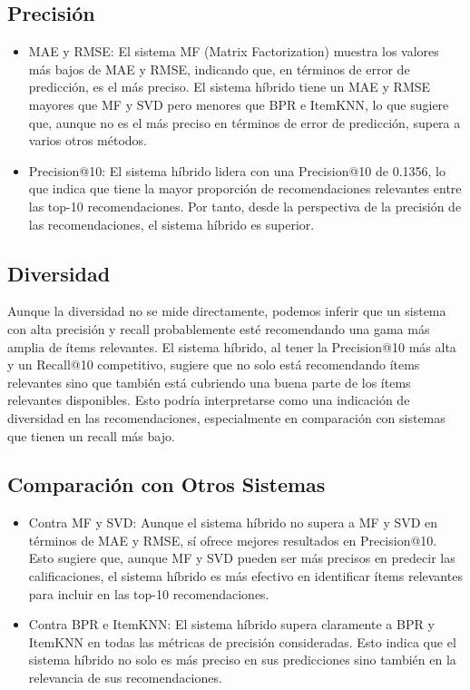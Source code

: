 \documentclass[a4paper,12pt]{report}
\begin{document}
    \subsection{Precisión}
    \begin{itemize}
    \item MAE y RMSE: El sistema MF (Matrix Factorization) muestra los valores más bajos de MAE y RMSE, indicando que, en términos de error de predicción, es el más preciso. El sistema híbrido tiene un MAE y RMSE mayores que MF y SVD pero menores que BPR e ItemKNN, lo que sugiere que, aunque no es el más preciso en términos de error de predicción, supera a varios otros métodos.
    
    \item Precision@10: El sistema híbrido lidera con una Precision@10 de 0.1356, lo que indica que tiene la mayor proporción de recomendaciones relevantes entre las top-10 recomendaciones. Por tanto, desde la perspectiva de la precisión de las recomendaciones, el sistema híbrido es superior.
    \end{itemize}
    

    \subsection{Diversidad}
    Aunque la diversidad no se mide directamente, podemos inferir que un sistema con alta precisión y recall probablemente esté recomendando una gama más amplia de ítems relevantes. El sistema híbrido, al tener la Precision@10 más alta y un Recall@10 competitivo, sugiere que no solo está recomendando ítems relevantes sino que también está cubriendo una buena parte de los ítems relevantes disponibles. Esto podría interpretarse como una indicación de diversidad en las recomendaciones, especialmente en comparación con sistemas que tienen un recall más bajo.


    \subsection{Comparación con Otros Sistemas}

    \begin{itemize}
        \item Contra MF y SVD: Aunque el sistema híbrido no supera a MF y SVD en términos de MAE y RMSE, sí ofrece mejores resultados en Precision@10. Esto sugiere que, aunque MF y SVD pueden ser más precisos en predecir las calificaciones, el sistema híbrido es más efectivo en identificar ítems relevantes para incluir en las top-10 recomendaciones.
        \item Contra BPR e ItemKNN: El sistema híbrido supera claramente a BPR y ItemKNN en todas las métricas de precisión consideradas. Esto indica que el sistema híbrido no solo es más preciso en sus predicciones sino también en la relevancia de sus recomendaciones.
    \end{itemize}
        
\end{document}
